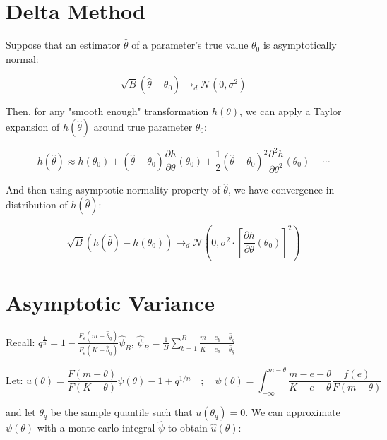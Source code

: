 
\section{Delta Method}

Suppose that an estimator $\hat\theta$ of a parameter's true value $\theta_0$ is asymptotically normal:

\begin{equation}
    \sqrt{B} (\hat\theta - \theta_0) \longrightarrow_d \mathcal{N} (0, \sigma^2)
\end{equation}

Then, for any "smooth enough" transformation $h(\theta)$, we can apply a Taylor expansion of $h(\hat\theta)$ around true parameter $\theta_0$:

\begin{equation}
h(\hat\theta) \approx h(\theta_0) + (\hat\theta - \theta_0)\frac{\partial h}{\partial\theta}(\theta_0) + \frac{1}{2} (\hat\theta - \theta_0)^2 \frac{\partial^2 h}{\partial\theta^2}(\theta_0) + \cdots
\end{equation}

And then using asymptotic normality property of $\hat\theta$, we have convergence in distribution of $h(\hat\theta)$:

\begin{equation}
    \sqrt{B} (h(\hat\theta) - h(\theta_0)) \longrightarrow_d \mathcal{N} \left( 0, \sigma^2 \cdot \left[ \frac{\partial h}{\partial \theta} (\theta_0) \right]^2 \right)
\end{equation}

\clearpage

\section{Asymptotic Variance}

Recall: $q^{\frac{1}{n}} = 1 - \frac{F_\varepsilon(m - \hat{\theta}_q)}{F_\varepsilon(K - \hat{\theta}_q)} \hat\psi_B$,  $\hat\psi_B =  \frac{1}{B} \sum_{b=1}^B \frac{m-e_b-\hat\theta_q}{K-e_b-\hat{\theta}_q}$

\begin{equation}
    \text{Let: } u(\theta) = \frac{F(m - \theta)}{F(K - \theta)} \psi(\theta) - 1 + q^{1/n} \quad;\quad \psi(\theta) = \int^{m-\theta}_{-\infty} \frac{m - e - \theta}{K - e - \theta } \frac{f(e)}{F(m - \theta)}
\end{equation}

and let $\theta_q$ be the sample quantile such that $u(\theta_q) = 0$. We can approximate $\psi(\theta)$ with a monte carlo integral $\hat\psi$ to obtain $\hat{u}(\theta)$:

